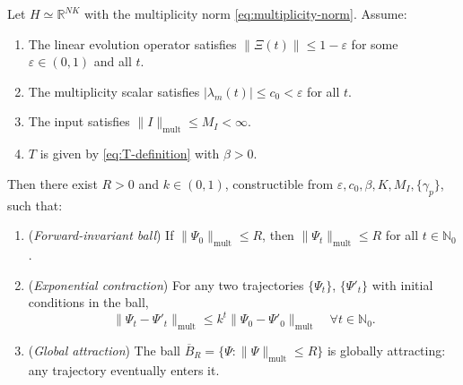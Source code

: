 \documentclass[11pt]{article}
\begin{document}
\begin{theorem}
\label{thm:discrete}
Let \(H \simeq \mathbb{R}^{NK}\) with the multiplicity norm \eqref{eq:multiplicity-norm}.
Assume:
\begin{enumerate}[label=(\roman*), leftmargin=*]
  \item The linear evolution operator satisfies \(\|\Xi(t)\|\le 1-\varepsilon\) for some \(\varepsilon\in(0,1)\) and all \(t\).
  \item The multiplicity scalar satisfies \(|\lambda_m(t)|\le c_0<\varepsilon\) for all \(t\).
  \item The input satisfies \(\|I\|_{\mathrm{mult}}\le M_I < \infty\).
  \item \(T\) is given by \eqref{eq:T-definition} with \(\beta>0\).
\end{enumerate}
Then there exist \(R>0\) and \(k\in(0,1)\), constructible from \(\varepsilon, c_0, \beta, K, M_I, \{\gamma_p\}\), such that:
\begin{enumerate}[label=(\alph*), leftmargin=*]
  \item (\emph{Forward-invariant ball}) If \(\|\Psi_0\|_{\mathrm{mult}}\le R\), then \(\|\Psi_t\|_{\mathrm{mult}}\le R\) for all \(t\in\mathbb{N}_0\).
  \item (\emph{Exponential contraction}) For any two trajectories \(\{\Psi_t\}\), \(\{\Psi'_t\}\) with initial conditions in the ball,
  \[
  \|\Psi_t - \Psi'_t\|_{\mathrm{mult}} \le k^t \|\Psi_0 - \Psi'_0\|_{\mathrm{mult}} \quad \forall t\in\mathbb{N}_0.
  \]
  \item (\emph{Global attraction}) The ball \(\overline{B}_R = \{\Psi : \|\Psi\|_{\mathrm{mult}}\le R\}\) is globally attracting: any trajectory eventually enters it.
\end{enumerate}
\end{theorem}
\end{document}
